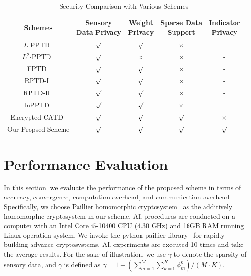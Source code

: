 \documentclass[conference]{IEEEtran}
\begin{document}
\begin{table}[htb]
  \centering
  \caption{Security Comparison with Various Schemes}~\label{tab:security}
  \linespread{1.3}\selectfont
  \begin{adjustbox}{max width=0.5\textwidth}
  \begin{tabular}{ccccc}
    \hline
    \hline
    Schemes & \makecell[c]{Sensory \\ Data Privacy} & \makecell[c]{Weight \\ Privacy} & \makecell[c]{Sparse Data \\ Support} & \makecell[c]{Indicator \\ Privacy} \\
    \hline
    $L$-PPTD~\cite{miao_lightweight_2017} & $\surd$ & $\surd$ & $\times$ & - \\
    $L^2$-PPTD~\cite{miao_lightweight_2017} & $\surd$ & $\times$ & $\times$ & - \\
    EPTD~\cite{xu_efficient_2019} & $\surd$ & $\surd$ & $\times$ & - \\
    RPTD-I~\cite{zhang_reliable_2019} & $\surd$ & $\surd$ & $\times$ & - \\
    RPTD-II~\cite{zhang_reliable_2019} & $\surd$ & $\surd$ & $\times$ & - \\
    InPPTD~\cite{xue_inpptd_2020} & $\surd$ & $\surd$ & $\times$ & - \\
    Encrypted CATD~\cite{zheng_learning_2018} & $\surd$ & $\surd$ & $\surd$ & $\times$ \\
    Our Propsed Scheme & $\surd$ & $\surd$ & $\surd$ & $\surd$ \\
    \hline
    \hline
  \end{tabular}  
  \end{adjustbox}
\end{table}

\section{Performance Evaluation}\label{sec7}
In this section, we evaluate the performance of the proposed scheme in terms of accuracy, convergence, computation overhead, and communication overhead.
Specifically, we choose Paillier homomorphic cryptosystem~\cite{paillier_public-key_1999} as the additively homomorphic cryptosystem in our scheme.
All procedures are conducted on a computer with an Intel Core i5-10400 CPU (4.30 GHz) and 16GB RAM running Linux operation system.
We invoke the python-paillier library~\cite{PythonPaillier} for rapidly building advance cryptosystems.
All experiments are executed 10 times and take the average results.
For the sake of illustration, we use $\gamma$ to denote the sparsity of sensory data, and $\gamma$ is defined as $\gamma = 1 - (\sum_{m=1}^M\sum_{k=1}^K\phi_m^k) / (M\cdot K)$.
\end{document}

